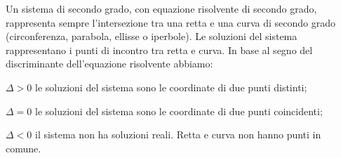 \conclusione
Un sistema di secondo grado, con equazione risolvente di secondo grado, 
rappresenta sempre l'intersezione tra una retta e una curva di secondo grado 
(circonferenza, parabola, ellisse o iperbole). Le soluzioni del sistema 
rappresentano i punti di incontro tra retta e curva. In base al segno del 
discriminante dell'equazione risolvente abbiamo:
\begin{itemize*}
\item $\Delta >0$ le soluzioni del sistema sono le coordinate di due punti 
distinti;
\item $\Delta =0$ le soluzioni del sistema sono le coordinate di due punti 
coincidenti;
\item $\Delta <0$ il sistema non ha soluzioni reali. Retta e curva non hanno 
punti in comune.
\end{itemize*}
\begin{center}

\end{center}

